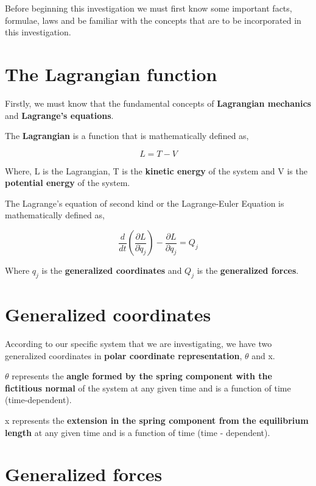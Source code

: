 {Before beginning this investigation we must first know some important facts, formulae, laws and be familiar with the concepts that are to be incorporated in this investigation.}

\section{{The Lagrangian function}}
        
    {Firstly, we must know that the fundamental concepts of \textbf{Lagrangian mechanics} and \textbf{Lagrange's equations}.}
        
    {The \textbf{Lagrangian} is a function that is mathematically defined as,}
        
    $$L = T - V$$
        
    {Where, L is the Lagrangian, T is the \textbf{kinetic energy} of the system and V is the \textbf{potential energy} of the system.}
        
    {The Lagrange's equation of second kind or the Lagrange-Euler Equation is mathematically defined as,}
        
    $$\frac{d}{dt}\left(\frac{\partial L}{\partial \dot{q}_j}\right) - \frac{\partial L}{\partial q_j} = Q_j$$
        
    {Where $q_j$ is the \textbf{generalized coordinates} and $Q_j$ is the \textbf{generalized forces}.}
      
    \section{{Generalized coordinates}}
        
    {According to our specific system that we are investigating, we have two generalized coordinates in \textbf{polar coordinate representation}, $\theta$ and x.}
        
    {$\theta$ represents the \textbf{angle formed by the spring component with the fictitious normal} of the system at any given time and is a function of time (time-dependent).}
        
    {x represents the \textbf{extension in the spring component from the equilibrium length} at any given time and is a function of time (time - dependent).}
            
    \section{{Generalized forces}}
        
